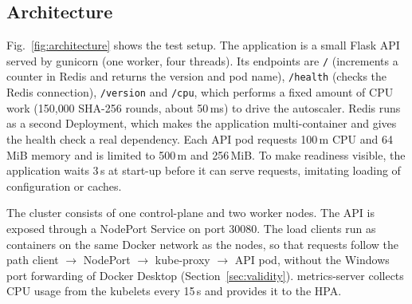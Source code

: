\documentclass[conference,a4paper]{IEEEtran}
\begin{document}
\subsection{Architecture}
Fig.~\ref{fig:architecture} shows the test setup. The application is a small Flask API served by gunicorn (one worker, four threads). Its endpoints are \texttt{/} (increments a counter in Redis and returns the version and pod name), \texttt{/health} (checks the Redis connection), \texttt{/version} and \texttt{/cpu}, which performs a fixed amount of CPU work (150{,}000 SHA-256 rounds, about 50\,ms) to drive the autoscaler. Redis runs as a second Deployment, which makes the application multi-container and gives the health check a real dependency. Each API pod requests 100\,m CPU and 64\,MiB memory and is limited to 500\,m and 256\,MiB. To make readiness visible, the application waits 3\,s at start-up before it can serve requests, imitating loading of configuration or caches.

The cluster consists of one control-plane and two worker nodes. The API is exposed through a NodePort Service on port 30080. The load clients run as containers on the same Docker network as the nodes, so that requests follow the path client $\rightarrow$ NodePort $\rightarrow$ kube-proxy $\rightarrow$ API pod, without the Windows port forwarding of Docker Desktop (Section~\ref{sec:validity}). metrics-server collects CPU usage from the kubelets every 15\,s and provides it to the HPA.
\end{document}

